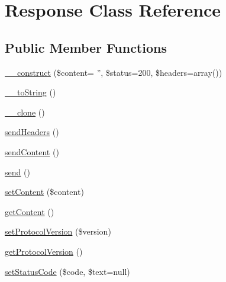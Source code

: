 \hypertarget{class_symfony_1_1_component_1_1_http_foundation_1_1_response}{
\section{\-Response \-Class \-Reference}
\label{class_symfony_1_1_component_1_1_http_foundation_1_1_response}
}
\subsection*{\-Public \-Member \-Functions}
\begin{DoxyCompactItemize}
\item 
\hyperlink{class_symfony_1_1_component_1_1_http_foundation_1_1_response_a22bf5541ea075f7627f7feff81bd822f}{\-\_\-\-\_\-construct} (\$content= '', \$status=200, \$headers=array())
\item 
\hyperlink{class_symfony_1_1_component_1_1_http_foundation_1_1_response_a7516ca30af0db3cdbf9a7739b48ce91d}{\-\_\-\-\_\-to\-String} ()
\item 
\hyperlink{class_symfony_1_1_component_1_1_http_foundation_1_1_response_ad0cb87b388bc74d63dc884accdca8713}{\-\_\-\-\_\-clone} ()
\item 
\hyperlink{class_symfony_1_1_component_1_1_http_foundation_1_1_response_abab55ed2b1496fd1d0f631fc99d71ed4}{send\-Headers} ()
\item 
\hyperlink{class_symfony_1_1_component_1_1_http_foundation_1_1_response_ab3edae72c871ac25cab152d5022355d4}{send\-Content} ()
\item 
\hyperlink{class_symfony_1_1_component_1_1_http_foundation_1_1_response_a12bcef5130168b80d3d52dc82213f19a}{send} ()
\item 
\hyperlink{class_symfony_1_1_component_1_1_http_foundation_1_1_response_a04a5eddb7c3abc7bf31fa25b58f046bf}{set\-Content} (\$content)
\item 
\hyperlink{class_symfony_1_1_component_1_1_http_foundation_1_1_response_a58e43f09a06ce4e29b192c4e17ce7915}{get\-Content} ()
\item 
\hyperlink{class_symfony_1_1_component_1_1_http_foundation_1_1_response_a05fdfbbce6c3e0d2da2ce81dc2ae64d2}{set\-Protocol\-Version} (\$version)
\item 
\hyperlink{class_symfony_1_1_component_1_1_http_foundation_1_1_response_a915c3328b367338a7c0eddb1e3294e9a}{get\-Protocol\-Version} ()
\item 
\hyperlink{class_symfony_1_1_component_1_1_http_foundation_1_1_response_a687da1a6026250bb581118674801479b}{set\-Status\-Code} (\$code, \$text=null)

\end{DoxyCompactItemize}
